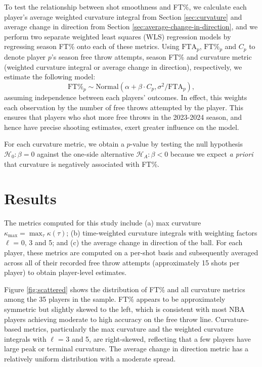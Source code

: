 \documentclass{article}
\begin{document}
      To test the relationship between shot smoothness and FT\%, we calculate each player's average weighted curvature integral from Section \ref{sec:curvature} and average change in direction from Section \ref{sec:average-change-in-direction}, and we perform two separate weighted least squares (WLS) regression models by regressing season FT\% onto each of these metrics. Using \(\mbox{FTA}_p\), \(\mbox{FT\%}_p\) and \(C_p\) to denote player $p$'s season free throw attempts, season FT\% and curvature metric (weighted curvature integral or average change in direction), respectively, we estimate the following model:
      \begin{equation}
      \label{eqn:weighted-least-squares}
        \mbox{FT\%}_p \sim \mbox{Normal}(\alpha + \beta \cdot C_p, \sigma^2 / \mbox{FTA}_p),
      \end{equation}
      assuming independence between each players' outcomes. In effect, this weights each observation by the number of free throws attempted by the player. This ensures that players who shot more free throws in the 2023-2024 season, and hence have precise shooting estimates, exert greater influence on the model.

      For each curvature metric, we obtain a $p$-value by testing the null hypothesis $\mathcal{H}_0: \beta = 0$ against the one-side alternative $\mathcal{H}_A: \beta < 0$ because we expect {\it a priori} that curvature is negatively associated with FT\%.
    
\section{Results}
    
    The metrics computed for this study include (a) max curvature $\kappa_{\max} = \max_\tau \kappa(\tau)$; (b) time-weighted curvature integrals with weighting factors $\ell$ = 0, 3 and 5; and (c) the average change in direction of the ball. For each player, these metrics are computed on a per-shot basis and subsequently averaged across all of their recorded free throw attempts (approximately 15 shots per player) to obtain player-level estimates.

    Figure \ref{fig:scattered} shows the distribution of FT\% and all curvature metrics among the 35 players in the sample. FT\% appears to be approximately symmetric but slightly skewed to the left, which is consistent with most NBA players achieving moderate to high accuracy on the free throw line. Curvature-based metrics, particularly the max curvature and the weighted curvature integrals with $\ell$ = 3 and 5, are right-skewed, reflecting that a few players have large peak or terminal curvature. The average change in direction metric has a relatively uniform distribution with a moderate spread.
\end{document}
